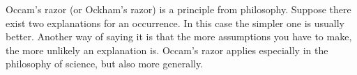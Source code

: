 Occam's razor (or Ockham's razor) is a principle from philosophy. Suppose there exist two explanations for an occurrence. In this case the simpler one is usually better. Another way of saying it is that the more assumptions you have to make, the more unlikely an explanation is. 
Occam's razor applies especially in the philosophy of science, but also more generally.
